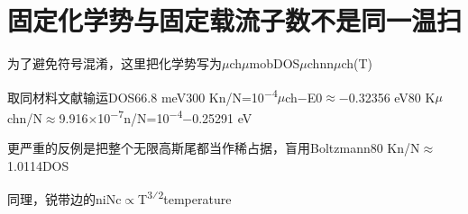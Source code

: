 \section{{\cjkfont 固定化学势与固定载流子数不是同一温扫}\allowbreak{}}\label{sec:48}
{\cjkfont 为了避免符号混淆，这里把化学势写为}\allowbreak{}\ensuremath{\mu}ch\allowbreak{}\ensuremath{\mu}mob\allowbreak{}DOS\allowbreak{}\ensuremath{\mu}ch\allowbreak{}n\allowbreak{}n\allowbreak{}\ensuremath{\mu}ch(T)\allowbreak{}
\par
{\cjkfont 取同材料文献输运}\allowbreak{}DOS\allowbreak{}66.8 meV\allowbreak{}300 K\allowbreak{}n/N=\allowbreak{}10\textsuperscript{−4}\allowbreak{}\ensuremath{\mu}ch−E0\ensuremath{\approx}\allowbreak{}−0.32356 eV\allowbreak{}80 K\allowbreak{}\ensuremath{\mu}ch\allowbreak{}n/N\ensuremath{\approx}\allowbreak{}9.916\ensuremath{\times}10\textsuperscript{−7}\allowbreak{}n/N=\allowbreak{}10\textsuperscript{−4}\allowbreak{}−0.25291 eV\allowbreak{}
\par
{\cjkfont 更严重的反例是把整个无限高斯尾都当作稀占据，盲用}\allowbreak{}Boltzmann\allowbreak{}80 K\allowbreak{}n/N\ensuremath{\approx}\allowbreak{}1.0114\allowbreak{}DOS\allowbreak{}
\par
{\cjkfont 同理，锐带边的}\allowbreak{}ni\allowbreak{}Nc\ensuremath{\propto}T\textsuperscript{3⁄2}\allowbreak{}temperature\allowbreak{}
